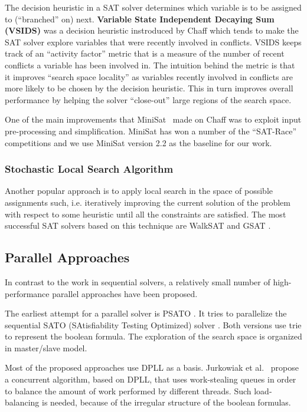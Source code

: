 \documentclass[letterpaper, compsoc, conference]{IEEEtran}
\begin{document}
The decision heuristic in a SAT solver determines which variable is to be
assigned to (``branched'' on) next.  \textbf{Variable State Independent
Decaying Sum (VSIDS)} was a decision heuristic instroduced by Chaff which tends
to make the SAT solver explore variables that were recently involved in
conflicts. VSIDS keeps track of an ``activity factor'' metric that is a measure
of the number of recent conflicts a variable has been involved in.  The
intuition behind the metric is that it improves ``search space locality'' as
variables recently involved in conflicts are more likely to be chosen by the
decision heuristic.  This in turn improves overall performance by helping the
solver ``close-out'' large regions of the search space.

One of the main improvements that MiniSat~\cite{MiniSat} made on Chaff was to
exploit input pre-processing and simplification. MiniSat has won a number of
the ``SAT-Race'' competitions and we use MiniSat version 2.2 as the baseline
for our work.

\subsubsection{Stochastic Local Search Algorithm}
Another popular approach is to apply local search in the space of possible
assignments such, i.e. iteratively improving the current solution of the
problem with respect to some heuristic until all the constraints are satisfied.
The most successful SAT solvers based on this technique are WalkSAT
\cite{WalkSAT} and GSAT \cite{GSAT}.

\subsection{Parallel Approaches}
In contrast to the work in sequential solvers, a relatively small number of 
high-performance parallel approaches have been proposed.

\indent The earliest attempt for a parallel solver is PSATO \cite{PSATO}. It tries
to parallelize the sequential SATO (SAtisfiability Testing Optimized) solver
\cite{SATO}. Both versions use trie to represent the boolean formula. The exploration
of the search space is organized in master/slave model.

\indent Most of the proposed approaches use DPLL as a basis. Jurkowiak et al.~\cite{Jurkowiak} propose a concurrent algorithm, based on DPLL, that uses work-stealing queues in order to balance the amount of work performed by different threads. Such load-balancing is needed, because of the irregular structure of the boolean formulas. 
\end{document}
